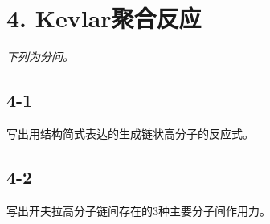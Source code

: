 \section*{4. Kevlar聚合反应}
\textit{下列为分问。}

\subsection*{4-1}
写出⽤结构简式表达的⽣成链状⾼分⼦的反应式。

\subsection*{4-2}
写出开夫拉⾼分⼦链间存在的3种主要分⼦间作⽤⼒。
